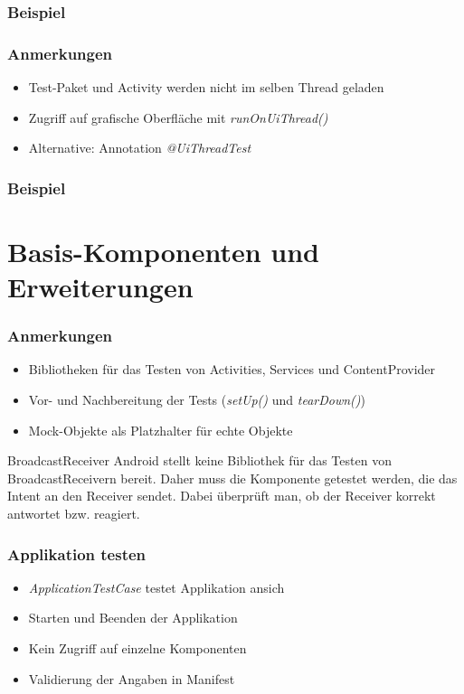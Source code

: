 \begin{frame}
	\frametitle{Beispiel}
	
\end{frame}

\begin{frame}
	\frametitle{Anmerkungen}
	\begin{itemize}
		\item Test-Paket und Activity werden nicht im selben Thread geladen
		\item Zugriff auf grafische Oberfläche mit \emph{runOnUiThread()}
		\item Alternative: Annotation \emph{@UiThreadTest}
	\end{itemize}
\end{frame}

\begin{frame}
	\frametitle{Beispiel}
	
\end{frame}

\section{Basis-Komponenten und Erweiterungen}

\begin{frame}
	\frametitle{Anmerkungen}
	\begin{itemize}
		\item Bibliotheken für das Testen von Activities, Services und ContentProvider
		\item Vor- und Nachbereitung der Tests (\emph{setUp()} und \emph{tearDown()})
		\item Mock-Objekte als Platzhalter für echte Objekte
	\end{itemize}

	\begin{alertblock}{BroadcastReceiver}
		Android stellt keine Bibliothek für das Testen von BroadcastReceivern 
		bereit. Daher muss die Komponente getestet werden, die das Intent an den Receiver sendet. 
		Dabei überprüft man, ob der Receiver korrekt antwortet bzw. reagiert.
	\end{alertblock}
\end{frame}

\begin{frame}
	\frametitle{Applikation testen}
	\begin{itemize}
		\item \emph{ApplicationTestCase} testet Applikation ansich
		\item Starten und Beenden der Applikation
		\item Kein Zugriff auf einzelne Komponenten
		\item Validierung der Angaben in Manifest
	\end{itemize}
\end{frame}

